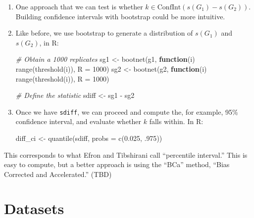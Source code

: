 \documentclass[
]{book}
\newenvironment{Shaded}{\begin{snugshade}}{\end{snugshade}}
\newcommand{\AttributeTok}[1]{\textcolor[rgb]{0.77,0.63,0.00}{#1}}
\newcommand{\CommentTok}[1]{\textcolor[rgb]{0.56,0.35,0.01}{\textit{#1}}}
\newcommand{\ControlFlowTok}[1]{\textcolor[rgb]{0.13,0.29,0.53}{\textbf{#1}}}
\newcommand{\DecValTok}[1]{\textcolor[rgb]{0.00,0.00,0.81}{#1}}
\newcommand{\FloatTok}[1]{\textcolor[rgb]{0.00,0.00,0.81}{#1}}
\newcommand{\FunctionTok}[1]{\textcolor[rgb]{0.00,0.00,0.00}{#1}}
\newcommand{\NormalTok}[1]{#1}
\newcommand{\OtherTok}[1]{\textcolor[rgb]{0.56,0.35,0.01}{#1}}
\newcommand{\SpecialCharTok}[1]{\textcolor[rgb]{0.00,0.00,0.00}{#1}}
\begin{document}
\begin{enumerate}
\def\labelenumi{\arabic{enumi}.}
\item
  One approach that we can test is whether \(k \in \mbox{ConfInt}(s(G_1) - s(G_2))\).
  Building confidence intervals with bootstrap could be more intuitive.
\item
  Like before, we use bootstrap to generate a distribution of \(s(G_1)\) and
  \(s(G_2)\), in R:

\begin{Shaded}
\begin{Highlighting}[]
\CommentTok{\# Obtain a 1000 replicates}
\NormalTok{sg1 }\OtherTok{\textless{}{-}} \FunctionTok{bootnet}\NormalTok{(g1, }\ControlFlowTok{function}\NormalTok{(i) }\FunctionTok{range}\NormalTok{(}\FunctionTok{threshold}\NormalTok{(i)), }\AttributeTok{R =} \DecValTok{1000}\NormalTok{)}
\NormalTok{sg2 }\OtherTok{\textless{}{-}} \FunctionTok{bootnet}\NormalTok{(g2, }\ControlFlowTok{function}\NormalTok{(i) }\FunctionTok{range}\NormalTok{(}\FunctionTok{threshold}\NormalTok{(i)), }\AttributeTok{R =} \DecValTok{1000}\NormalTok{)}

\CommentTok{\# Define the statistic}
\NormalTok{sdiff }\OtherTok{\textless{}{-}}\NormalTok{ sg1 }\SpecialCharTok{{-}}\NormalTok{ sg2}
\end{Highlighting}
\end{Shaded}
\item
  Once we have \texttt{sdiff}, we can proceed and compute the, for example, 95\%
  confidence interval, and evaluate whether \(k\) falls within. In R:

\begin{Shaded}
\begin{Highlighting}[]
\NormalTok{diff\_ci }\OtherTok{\textless{}{-}} \FunctionTok{quantile}\NormalTok{(sdiff, }\AttributeTok{probs =} \FunctionTok{c}\NormalTok{(}\FloatTok{0.025}\NormalTok{, .}\DecValTok{975}\NormalTok{))}
\end{Highlighting}
\end{Shaded}
\end{enumerate}

This corresponds to what Efron and Tibshirani call ``percentile interval.''
This is easy to compute, but a better approach is using the ``BCa'' method,
``Bias Corrected and Accelerated.'' (TBD)

\cleardoublepage

\hypertarget{appendix-appendix}{%
\appendix}


\hypertarget{datasets}{%
\chapter{Datasets}\label{datasets}}
\end{document}
